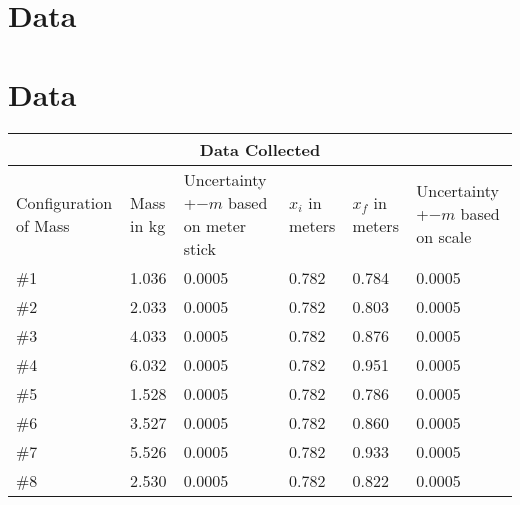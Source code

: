 \chapter{Data}
\let\clearpage\relax\chapter{Data}
\endgroup

\begin{tabular}{ |p{2cm}|p{2cm}|p{2cm}|p{2cm}|p{2cm}|p{2cm}| }
  \hline
  \multicolumn{6}{|c|}{Data Collected} \\
  \hline
  Configuration of Mass & Mass in kg & Uncertainty +$-m$ based on meter stick& $x_i$ in meters & $x_f$ in meters & Uncertainty +$-m$ based on scale\\
  \hline
  \#1& 1.036 &  0.0005 & 0.782 & 0.784 & 0.0005\\
  \hline
  \#2& 2.033 &  0.0005 & 0.782 & 0.803 & 0.0005\\
  \hline
  \#3& 4.033 &  0.0005 & 0.782 & 0.876 & 0.0005\\
  \hline
  \#4& 6.032 &  0.0005 & 0.782 & 0.951 & 0.0005\\
  \hline
  \#5& 1.528 &  0.0005 & 0.782 & 0.786 & 0.0005\\
  \hline
  \#6& 3.527 &  0.0005 & 0.782 & 0.860 & 0.0005\\
  \hline
  \#7& 5.526 &  0.0005 & 0.782 & 0.933 & 0.0005\\
  \hline
  \#8& 2.530 &  0.0005 & 0.782 & 0.822 & 0.0005\\
  \hline
\end{tabular}
